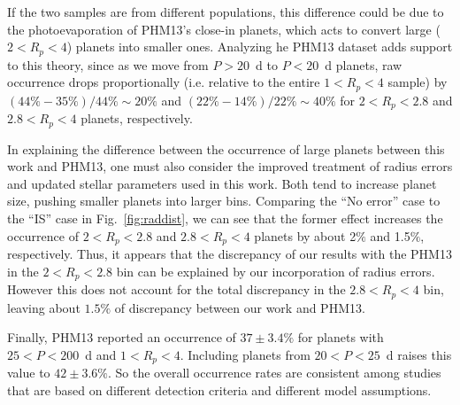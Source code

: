 If the two samples are from different populations, this difference could be due to the
photoevaporation \citep{Owen2013} of PHM13's close-in planets, 
which acts to convert large ($2<R_p<4$\rearth{})
planets into smaller ones. Analyzing he PHM13 dataset
adds support to this theory, since as we move from $P>20$~d to $P<20$~d planets, 
raw occurrence drops proportionally (i.e. relative to the entire $1<R_p<4$\rearth{} sample) by 
$(44 \% - 35 \%)/ 44 \% \sim 20 \%$ and $(22 \% - 14 \%)/ 22 \% \sim 40 \%$ for 
$2<R_p<2.8$\rearth{} and $2.8<R_p<4$\rearth{}  
planets, respectively.



In explaining the difference between the occurrence of large planets between this work and PHM13, 
one must also consider the improved treatment of
radius errors and updated \citet{Huber2014} stellar parameters used in this work. 
Both tend to increase planet size, pushing smaller planets into larger bins.
Comparing the ``No error'' case to the ``IS'' case in Fig.~\ref{fig:raddist}, we can see that
the former effect increases the occurrence of $2<R_p<2.8$\rearth{} and $2.8<R_p<4$\rearth{} 
planets by about 2$\%$ and 1.5$\%$, respectively. Thus, it appears that 
the discrepancy of our results with the PHM13 in the $2<R_p<2.8$\rearth{} bin can
be explained by our incorporation of radius errors. However this does not 
account for the total discrepancy in the $2.8<R_p<4$\rearth{} bin, leaving about $1.5\%$ of
discrepancy between our work and PHM13. 

Finally, PHM13 reported an occurrence of $37 \pm 3.4\%$ for planets with 
$25<P<200$~d and $1<R_p<4$\rearth{}. Including planets from 
$20 < P < 25$~d raises this value to $42 \pm 3.6\%$.  
So the overall occurrence rates are consistent among
studies that are based on different detection criteria and different
model assumptions. 

